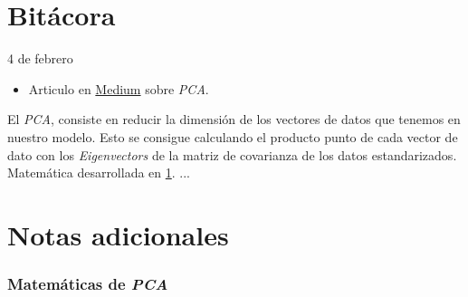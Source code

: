 
\maketitle

\part{Bitácora}
\begin{entry}{4 de febrero}
\tcbsubtitle{\LBlimportant}
\begin{itemize}
    \item Articulo en \href{https://medium.com/codex/principal-component-analysis-pca-how-it-works-mathematically-d5de4c7138e6}{Medium} sobre \textit{PCA}.
\end{itemize}
\tcblower
\tcbsubtitle{\LBlsummary}
El \textit{PCA}, consiste en reducir la dimensión de los vectores de datos que tenemos en nuestro modelo. Esto se consigue calculando el producto punto de cada vector de dato con los \textit{Eigenvectors} de la matriz de covarianza de los datos estandarizados. Matemática desarrollada en \ref{PCA-math}.
\vspace{0.4em}
\tcbsubtitle{\LBltodo}
...
\end{entry}

\newpage

\part{Notas adicionales}
\section{Matemáticas de \textit{PCA}}\label{PCA-math}

\newpage

\tableofcontents
